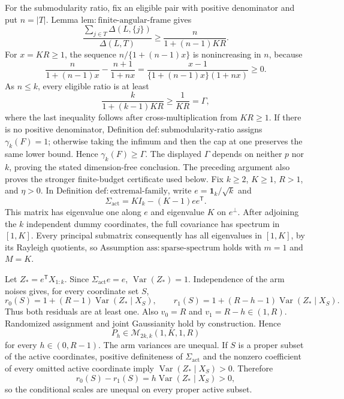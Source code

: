 For the submodularity ratio, fix an eligible pair with positive denominator and put \(n=|T|\). Lemma \(\mathrm{lem{:}finite\text{-}angular\text{-}frame}\) gives
\[
 \frac{\sum_{j\in T}\Delta(L,\{j\})}{\Delta(L,T)}
 \ge\frac{n}{1+(n-1)KR}.
\]
For \(x=KR\ge1\), the sequence \(n/\{1+(n-1)x\}\) is nonincreasing in \(n\), because
\[
 \frac{n}{1+(n-1)x}-\frac{n+1}{1+nx}
 =\frac{x-1}{\{1+(n-1)x\}(1+nx)}\ge0.
\]
As \(n\le k\), every eligible ratio is at least
\[
 \frac{k}{1+(k-1)KR}\ge\frac1{KR}=\Gamma,
\]
where the last inequality follows after cross-multiplication from \(KR\ge1\). If there is no positive denominator, Definition \(\mathrm{def{:}submodularity\text{-}ratio}\) assigns \(\gamma_k(F)=1\); otherwise taking the infimum and then the cap at one preserves the same lower bound. Hence \(\gamma_k(F)\ge\Gamma\). The displayed \(\Gamma\) depends on neither \(p\) nor \(k\), proving the stated dimension-free conclusion. The preceding argument also proves the stronger finite-budget certificate used below.
Fix \(k\ge2\), \(K\ge1\), \(R>1\), and \(\eta>0\). In Definition \(\mathrm{def{:}extremal\text{-}family}\), write \(e=\mathbf1_k/\sqrt{k}\) and
\[
 \Sigma_{\mathrm{act}}=KI_k-(K-1)ee^{\mathsf T}.
\]
This matrix has eigenvalue one along \(e\) and eigenvalue \(K\) on \(e^\perp\). After adjoining the \(k\) independent dummy coordinates, the full covariance has spectrum in \([1,K]\). Every principal submatrix consequently has all eigenvalues in \([1,K]\), by its Rayleigh quotients, so Assumption \(\mathrm{ass{:}sparse\text{-}spectrum}\) holds with \(m=1\) and \(M=K\).

Let \(Z_*=e^{\mathsf T}X_{1:k}\). Since \(\Sigma_{\mathrm{act}}e=e\), \(\operatorname{Var}(Z_*)=1\). Independence of the arm noises gives, for every coordinate set \(S\),
\[
 r_0(S)=1+(R-1)\operatorname{Var}(Z_*\mid X_S),
 \qquad
 r_1(S)=1+(R-h-1)\operatorname{Var}(Z_*\mid X_S).
\]
Thus both residuals are at least one. Also \(v_0=R\) and \(v_1=R-h\in(1,R)\). Randomized assignment and joint Gaussianity hold by construction. Hence
\[
 P_h\in\mathcal M_{2k,k}(1,K,1,R)
\]
for every \(h\in(0,R-1)\). The arm variances are unequal. If \(S\) is a proper subset of the active coordinates, positive definiteness of \(\Sigma_{\mathrm{act}}\) and the nonzero coefficient of every omitted active coordinate imply \(\operatorname{Var}(Z_*\mid X_S)>0\). Therefore
\[
 r_0(S)-r_1(S)=h\operatorname{Var}(Z_*\mid X_S)>0,
\]
so the conditional scales are unequal on every proper active subset.

